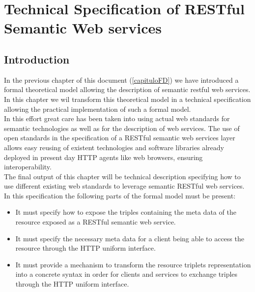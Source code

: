 \chapter{Technical Specification of RESTful Semantic Web services }\label{capituloTS}

\section{Introduction}

In the previous chapter of this document (\ref{capituloFD}) we have introduced a formal theoretical model allowing the description of
semantic restful web services. In this chapter we wil transform this theoretical model in a technical specification
allowing the practical implementation of such a formal model.\\
In this effort great care has been taken into using actual web standards for semantic technologies as well as for the
description of web services. The use of open standards in the specification of a RESTful semantic web services layer
allows easy reusing of existent technologies and software libraries already deployed in present day HTTP agents like web
browsers, ensuring interoperability.\\
The final output of this chapter will be technical description specifying  how to use different existing web standards to
leverage semantic RESTful web services.  In this specification  the following parts of the formal model
must be present:
\begin{itemize}
\item It must specify how to expose the triples containing the meta data of the resource exposed as a RESTful
  semantic web service.
\item It must specify the necessary meta data for a client being able to access the resource through the HTTP uniform
  interface.
\item It must provide a mechanism to transform the resource triplets representation into a concrete syntax in order for clients and
  services to exchange triples through the HTTP uniform interface.
\end{itemize}

